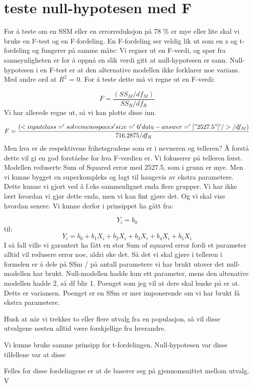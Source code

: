 \documentclass[
]{book}
\begin{document}
\hypertarget{teste-null-hypotesen-med-f}{%
\section{teste null-hypotesen med F}\label{teste-null-hypotesen-med-f}}

For å teste om en SSM eller en errorreduksjon på 78 \% er mye eller lite skal vi bruke en F-test og en F-fordeling. En F-fordeling ser veldig lik ut som en z og t-fordeling og fungerer på samme måte: Vi regner ut en F-verdi, og spør fra sannsynligheten er for å oppnå en slik verdi gitt at null-hypotesen er sann. Null-hypotesen i en F-test er at den alternative modellen ikke forklarer noe varians. Med andre ord at \(R^2\) = 0. For å teste dette må vi regne ut en F-verdi:

\[
F = \frac{(SS_M / df_M)}{SS_R / df_R}
\]
Vi har allerede regne ut, så vi kan plotte disse inn.

\[
F = \frac{(<input class='solveme nospaces' size='6' data-answer='["2527.5"]'/> / df_M)}{716.2875 / df_R}
\]
Men hva er de respektivene frihetsgradene som er i nevneren og telleren? Å forstå dette vil gi en god forståelse for hva F-verdien er. Vi fokuserer på telleren først. Modellen reduserte Sum of Squared error med 2527.5, som i grunn er mye. Men vi kunne bygget en superkompleks og lagt til haugevis av ekstra parametere. Dette kunne vi gjort ved å f.eks sammenlignet enda flere grupper. Vi har ikke lært hvordan vi gjør dette enda, men vi kan fint gjøre det. Og vi skal vise hvordan senere. Vi kunne derfor i prinsippet ha gått fra:

\[
Y_i = b_0
\]
til:
\[
Y_i  = b_0 + b_1X_i + b_2X_i + b_3X_i + b_4X_i + b_5X_i
\]
I så fall ville vi garantert ha fått en stor Sum of squared error fordi et parameter alltid vil redusere error noe, aldri øke det. Så det vi skal gjøre i telleren i formelen er å dele på SSm / på antall parametere vi har brukt utover det null-modellen har brukt. Null-modellen hadde kun ett parameter, mens den altenative modellen hadde 2, så df blir 1. Poenget som jeg vil at dere skal huske på er at. Dette er variansen. Poenget er en SSm er mer imponerende om vi har brukt få ekstra parametere.

Husk at når vi trekker to eller flere utvalg fra en populasjon, så vil disse utvalgene nesten alltid være forskjellige fra hverandre.

Vi kunne bruke samme prinsipp for t-fordelingen. Null-hypotesen var disse tilfellene var at disse

Felles for disse fordelingene er at de baserer seg på gjennomsnittet mellom utvalg. V
\end{document}

